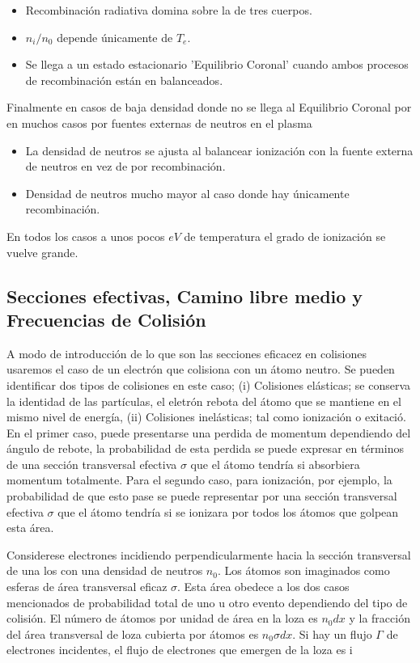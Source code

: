 \documentclass[11pt]{article}
\theoremstyle{definition}
\begin{document}
  \begin{itemize}
    \item Recombinaci\'on radiativa domina sobre la de tres cuerpos.
    \item $n_i/n_0$ depende \'unicamente de $T_e$.
    \item Se llega a un estado estacionario 'Equilibrio Coronal' cuando ambos procesos de recombinaci\'on est\'an en balanceados.
    \end{itemize}

  Finalmente en casos de baja densidad donde no se llega al Equilibrio Coronal por en muchos casos por fuentes externas de neutros en el plasma

  \begin{itemize}
    \item La densidad de neutros se ajusta al balancear ionizaci\'on con la fuente externa de neutros en vez de por recombinaci\'on.
    \item Densidad de neutros mucho mayor al caso donde hay \'unicamente recombinaci\'on. 
    \end{itemize}

      En todos los casos a unos pocos $eV$ de temperatura el grado de ionizaci\'on se vuelve grande.

  \subsection{Secciones efectivas, Camino libre medio y Frecuencias de Colisi\'on}

  A modo de introducci\'on de lo que son las secciones eficacez en colisiones usaremos el caso de un electr\'on que colisiona con un \'atomo neutro. Se pueden identificar dos tipos de colisiones en este caso; (i) Colisiones el\'asticas; se conserva la identidad de las part\'iculas, el eletr\'on rebota del \'atomo que se mantiene en el mismo nivel de energ\'ia, (ii) Colisiones inel\'asticas; tal como ionizaci\'on o exitaci\'o. En el primer caso, puede presentarse una perdida de momentum dependiendo del \'angulo de rebote, la probabilidad de esta perdida se puede expresar en t\'erminos de una secci\'on transversal efectiva $\sigma$ que el \'atomo tendr\'ia si absorbiera momentum totalmente. Para el segundo caso, para ionizaci\'on, por ejemplo, la probabilidad de que esto pase se puede representar por una secci\'on transversal efectiva $\sigma$ que el \'atomo tendr\'ia si se ionizara por todos los \'atomos que golpean esta \'area.

  Considerese electrones incidiendo perpendicularmente hacia la secci\'on transversal de una los con una densidad de neutros $n_0$. Los \'atomos son imaginados como esferas de \'area transversal eficaz $\sigma$. Esta \'area obedece a los dos casos mencionados de probabilidad total de uno u otro evento dependiendo del tipo de colisi\'on. El n\'umero de \'atomos por unidad de \'area en la loza es $n_0 dx$ y la fracci\'on del \'area transversal de loza cubierta por \'atomos es $n_0\sigma dx$. Si hay un flujo $\Gamma$ de electrones incidentes, el flujo de electrones que emergen de la loza es i
\end{document}
